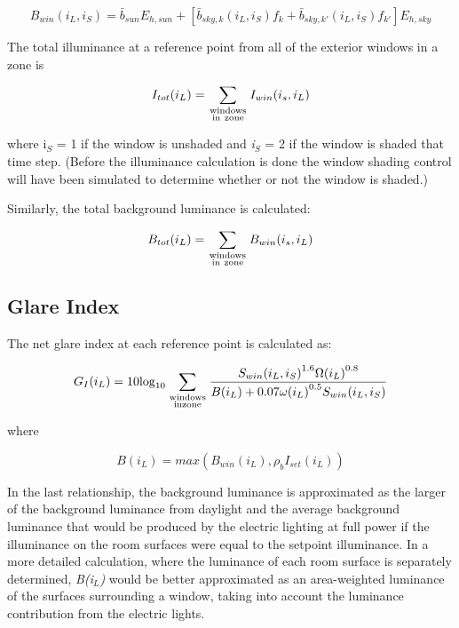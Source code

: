 \begin{equation}
{B_{win}}({i_L},{i_S}) = {\bar b_{sun}}{E_{h,sun}} + [{\bar b_{sky,k}}({i_L},{i_S}){f_k} + {\bar b_{sky,k'}}({i_L},{i_S}){f_{k'}}]{E_{h,sky}}
\end{equation}

The total illuminance at a reference point from all of the exterior windows in a zone is

\begin{equation}
  {I_{tot}}({i_L}) = \sum\limits_{\scriptstyle{\rm{windows}}\atop\scriptstyle{\rm{in~zone}}} {{I_{win}}({i_s},{i_L})}
\end{equation}

where i\(_{S}\) = 1 if the window is unshaded and \emph{i\(_{S}\)} = 2 if the window is shaded that time step. (Before the illuminance calculation is done the window shading control will have been simulated to determine whether or not the window is shaded.)

Similarly, the total background luminance is calculated:

\begin{equation}
{B_{tot}}({i_L}) = \sum\limits_{\scriptstyle{\rm{windows}}\atop\scriptstyle{\rm{in~zone}}} {{B_{win}}({i_s},{i_L})}
\end{equation}

\subsection{Glare Index}\label{glare-index-000}

The net glare index at each reference point is calculated as:

\begin{equation}
{G_I}({i_L}) = 10{\log_{10}}\sum\limits_{\scriptstyle{\rm{windows}}\atop\scriptstyle{\rm{in zone}}} {\frac{{{S_{win}}{{({i_L},{i_S})}^{1.6}}\Omega {{({i_L})}^{0.8}}}}{{B({i_L}) + 0.07\omega {{({i_L})}^{0.5}}{S_{win}}({i_L},{i_S})}}}
\end{equation}

where

\begin{equation}
B\left( {{i_L}} \right) = max\left( {{B_{win}}\left( {{i_L}} \right),{\rho_b}{I_{set}}\left( {{i_L}} \right)} \right)
\end{equation}

In the last relationship, the background luminance is approximated as the larger of the background luminance from daylight and the average background luminance that would be produced by the electric lighting at full power if the illuminance on the room surfaces were equal to the setpoint illuminance. In a more detailed calculation, where the luminance of each room surface is separately determined, \emph{B(i\(_{L}\))} would be better approximated as an area-weighted luminance of the surfaces surrounding a window, taking into account the luminance contribution from the electric lights.

